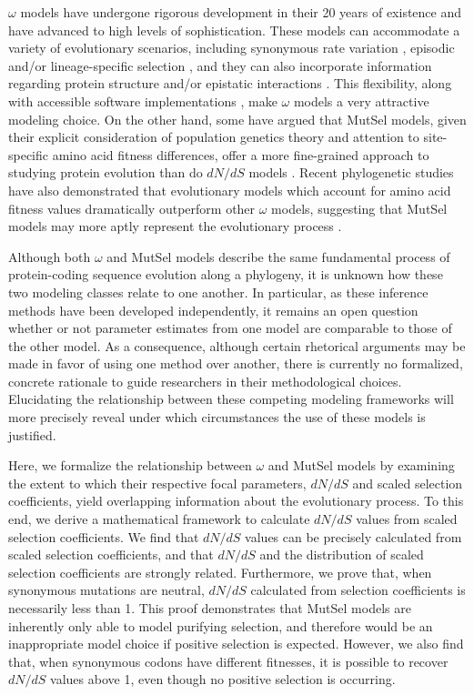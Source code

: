 \documentclass{pnastwo}
\begin{document}
\begin{article}
$\omega$ models have undergone rigorous development in their 20 years of existence and have advanced to high levels of sophistication. These models can accommodate a variety of evolutionary scenarios, including synonymous rate variation \cite{MuseGaut1994,KosakovskyPondMuse2005}, episodic \cite{KosakovskyPondetal2011,MEME} and/or lineage-specific selection \cite{YangNielsen2002,Zhangetal2005,KosakovskyPondFrost2005a}, and they can also incorporate information regarding protein structure and/or epistatic interactions \cite{Robinsonetal2003,Thorneetal2007,Rodrigueetal2009,Scherreretal2012,MeyerWilke2012}. This flexibility, along with accessible software implementations \cite{KosakovskyPondetal2005,Yang2007,Delport2010}, make $\omega$ models a very attractive modeling choice. On the other hand, some have argued that MutSel models, given their explicit consideration of population genetics theory and attention to site-specific amino acid fitness differences, offer a more fine-grained approach to studying protein evolution than do $dN/dS$ models \cite{HalpernBruno1998,Rodrigueetal2010,Tamurietal2012,Thorne2012}. Recent phylogenetic studies have also demonstrated that evolutionary models which account for amino acid fitness values dramatically outperform other $\omega$ models, suggesting that MutSel models may more aptly represent the evolutionary process \cite{Bloom2014a, Bloom2014b}. 
		
Although both $\omega$ and MutSel models describe the same fundamental process of protein-coding sequence evolution along a phylogeny, it is unknown how these two modeling classes relate to one another. In particular, as these inference methods have been developed independently, it remains an open question whether or not parameter estimates from one model are comparable to those of the other model. As a consequence, although certain rhetorical arguments may be made in favor of using one method over another, there is currently no formalized, concrete rationale to guide researchers in their methodological choices. Elucidating the relationship between these competing modeling frameworks will more precisely reveal under which circumstances the use of these models is justified.
		
Here, we formalize the relationship between $\omega$ and MutSel models by examining the extent to which their respective focal parameters, $dN/dS$ and scaled selection coefficients, yield overlapping information about the evolutionary process. To this end, we derive a mathematical framework to calculate $dN/dS$ values from scaled selection coefficients. We find that $dN/dS$ values can be precisely calculated from scaled selection coefficients, and that $dN/dS$ and the distribution of scaled selection coefficients are strongly related. Furthermore, we prove that, when synonymous mutations are neutral, $dN/dS$ calculated from selection coefficients is necessarily less than 1. This proof demonstrates that MutSel models are inherently only able to model purifying selection, and therefore would be an inappropriate model choice if positive selection is expected. However, we also find that, when synonymous codons have different fitnesses, it is possible to recover $dN/dS$ values above 1, even though no positive selection is occurring. 


\end{article}
\end{document}
